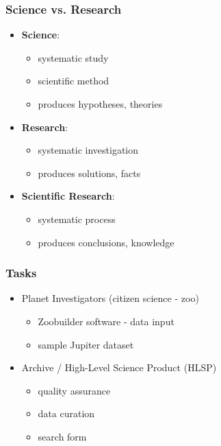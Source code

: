 \documentclass{beamer}
\begin{document}
\begin{frame}
  \frametitle{Science vs. Research}
  \begin{itemize}
    \item \textbf{Science}:
    \begin{itemize}
      \item systematic study
      \item scientific method
      \item produces hypotheses, theories
    \end{itemize}
    \bigskip
    \item \textbf{Research}:
    \begin{itemize}
      \item systematic investigation
      \item produces solutions, facts
    \end{itemize}
    \bigskip
    \item \textbf{Scientific Research}:
    \begin{itemize}
      \item systematic process
      \item produces conclusions, knowledge
    \end{itemize}
  \end{itemize}
\end{frame}

\begin{frame}
  \frametitle{Tasks}
  \begin{itemize}
    \item Planet Investigators (citizen science - zoo)
    \begin{itemize}
      \item Zoobuilder software - data input
      \item sample Jupiter dataset
    \end{itemize}
    \bigskip
    \bigskip
    \item Archive / High-Level Science Product (HLSP)
    \begin{itemize}
      \item quality assurance
      \item data curation
      \item search form 
    \end{itemize}
  \end{itemize}
\end{frame}
\end{document}
